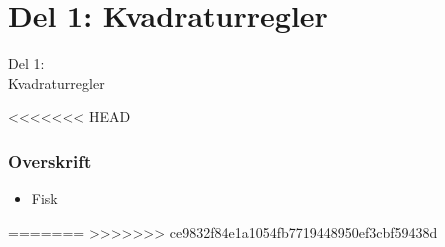\section{Del 1: Kvadraturregler}
\begin{frame}
\centering
\Huge
Del 1: \\
Kvadraturregler
\end{frame}
%
<<<<<<< HEAD
\begin{frame}
\frametitle{Overskrift}
\begin{itemize}
\item Fisk
\end{itemize}
\end{frame}
=======
>>>>>>> ce9832f84e1a1054fb7719448950ef3cbf59438d



